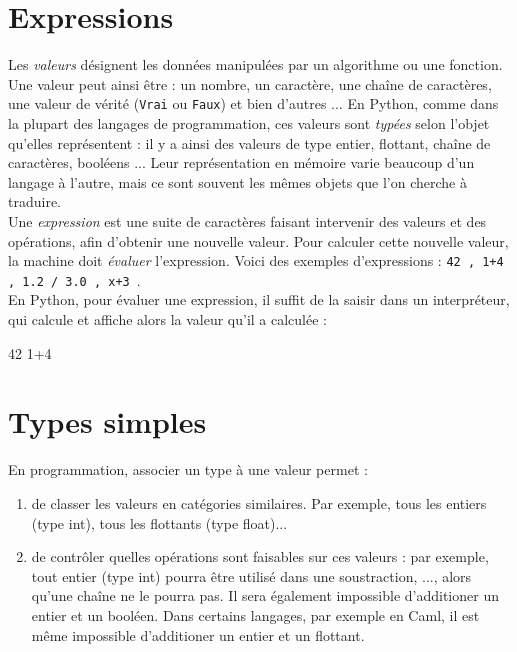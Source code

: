 \section{Expressions}


Les \emph{valeurs} désignent les données manipulées par un algorithme ou une fonction. Une valeur 
peut ainsi être  : un nombre, un caractère, une chaîne de caractères, une valeur de vérité 
(\texttt{Vrai} ou \texttt{Faux}) et bien d'autres ... En Python, comme dans la plupart des 
langages 
de programmation, ces valeurs sont \emph{typées} selon l'objet qu'elles représentent : il y a ainsi 
des valeurs de type entier, flottant, chaîne de caractères, booléens ...   Leur représentation en 
mémoire varie beaucoup d'un langage à l'autre, mais ce sont souvent les mêmes objets que l'on 
cherche à traduire.\\

Une \emph{expression} est une suite de caractères faisant intervenir des valeurs et des 
opérations, afin d'obtenir une nouvelle valeur. Pour calculer cette nouvelle valeur,
la machine doit \emph{évaluer} l'expression. Voici des exemples d'expressions : \texttt{42 , 1+4 , 
1.2 / 3.0 , x+3 }.\\
En Python, pour évaluer une expression, il suffit de la saisir dans un interpréteur, qui
calcule et affiche alors la valeur qu'il a calculée :\\
\begin{pyconsole}
42
1+4
\end{pyconsole}

\section{Types simples}

En programmation, associer un type à une valeur permet :
\begin{enumerate}
\item de classer les valeurs en catégories similaires. Par exemple, tous les
entiers (type int), tous les flottants (type float)...
\item de contrôler quelles opérations sont faisables sur ces valeurs : par
exemple, tout entier (type int) pourra être utilisé dans une soustraction, ..., alors 
qu'une chaîne ne le pourra pas. Il sera également impossible d'additioner un entier et un booléen. 
Dans certains langages, par exemple en Caml, il est même impossible d'additioner un entier et un 
flottant.                                             
\end{enumerate}

